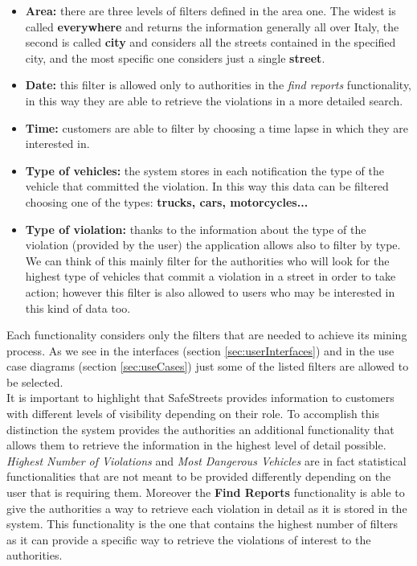 		\begin{itemize}
			\item \textbf{Area:} there are three levels of filters defined in the area one. The widest is called \textbf{everywhere} and returns the information generally all over Italy, the second is called \textbf{city} and considers all the streets contained in the specified city, and the most specific one considers just a single \textbf{street}.
			
			\item \textbf{Date:} this filter is allowed only to authorities in the \emph{find reports} functionality, in this way they are able to retrieve the violations in a more detailed search.
			
			\item \textbf{Time:} customers are able to filter by choosing a time lapse in which they are interested in. 
			
			\item \textbf{Type of vehicles:} the system stores in each notification the type of the vehicle that committed the violation. In this way this data can be filtered choosing one of the types: \textbf{trucks, cars, motorcycles...}
			
			\item \textbf{Type of violation:} thanks to the information about the type of the violation (provided by the user) the application allows also to filter by type. We can think of this  mainly filter for the authorities who will look for the highest type of vehicles that commit a violation in a street in order to take action; however this filter is also allowed to users who may be interested in this kind of data too.
		\end{itemize}
	
		Each functionality considers only the filters that are needed to achieve its mining process. As we see in the interfaces (section \ref{sec:userInterfaces}) and in the use case diagrams (section \ref{sec:useCases}) just some of the listed filters are allowed to be selected. \\
		
		It is important to highlight that SafeStreets provides information to customers with different levels of visibility depending on their role. To accomplish this distinction the system provides the authorities an additional functionality that allows them to retrieve the information in the highest level of detail possible. \emph{Highest Number of Violations} and \emph{Most Dangerous Vehicles} are in fact statistical functionalities that are not meant to be provided differently depending on the user that is requiring them. Moreover the \textbf{Find Reports} functionality is able to give the authorities a way to retrieve each violation in detail as it is stored in the system. This functionality is the one that contains the highest number of filters as it can provide a specific way to retrieve the violations of interest to the authorities. 


